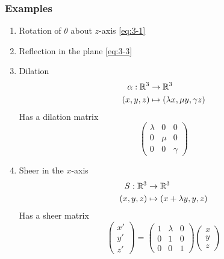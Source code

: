 \documentclass{article}
\numberwithin{equation}{section}
\begin{document}
\subsubsection{Examples}
\begin{enumerate}[label=\arabic*.]
    \item Rotation of $\theta$ about $z$-axis \eqref{eq:3-1}
    \item Reflection in the plane \eqref{eq:3-3}
    \item Dilation 
    \begin{align*}
        \alpha: \mathbb{R}^3 &\rightarrow \mathbb{R}^3 \\
        (x, y, z) &\mapsto (\lambda x, \mu y, \gamma z)
    \end{align*}
    Has a dilation matrix
    \[
        \begin{pmatrix}
            \lambda & 0 & 0 \\
            0 & \mu & 0 \\
            0 & 0 & \gamma
        \end{pmatrix}
    \]
    \item Sheer in the $x$-axis
    \begin{align*}
        S: \mathbb{R}^3 &\rightarrow \mathbb{R}^3 \\
        (x, y, z) &\mapsto (x + \lambda y, y, z)
    \end{align*}
    Has a sheer matrix
    \[
        \begin{pmatrix} 
        x' \\ y' \\ z'
        \end{pmatrix}
        = 
        \begin{pmatrix}
            1 & \lambda & 0 \\
            0 & 1 & 0 \\
            0 & 0 & 1
        \end{pmatrix}
        \begin{pmatrix}
            x \\ y \\ z
        \end{pmatrix}
    \]
\end{enumerate}
\end{document}
